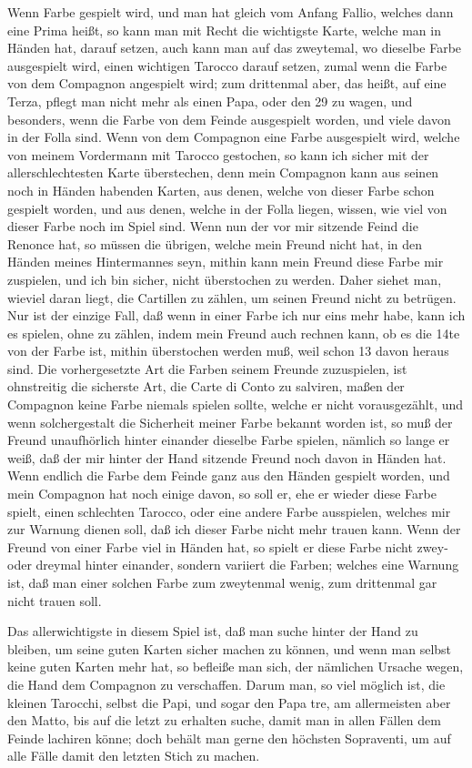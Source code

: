 \documentclass[11pt,a6paper,twoside]{article}
\begin{document}
Wenn Farbe gespielt wird, und man hat gleich vom Anfang Fallio, welches dann eine Prima heißt, so kann man mit Recht die wichtigste Karte, welche man in Händen hat, darauf setzen, auch kann man auf das zweytemal, wo dieselbe Farbe ausgespielt wird, einen wichtigen Tarocco darauf setzen, zumal wenn die Farbe von dem Compagnon angespielt wird; zum drittenmal aber, das heißt, auf eine Terza, pflegt man nicht mehr als einen Papa, oder den 29 zu wagen, und besonders, wenn die Farbe von dem Feinde ausgespielt worden, und viele davon in der Folla sind. Wenn von dem Compagnon eine Farbe ausgespielt wird, welche von meinem Vordermann mit Tarocco gestochen, so kann ich sicher mit der allerschlechtesten Karte überstechen, denn mein Compagnon kann aus seinen noch in Händen habenden Karten, aus denen, welche von dieser Farbe schon gespielt worden, und aus denen, welche in der Folla liegen, wissen, wie viel von dieser Farbe noch im Spiel sind. Wenn nun der vor mir sitzende Feind die Renonce hat, so müssen die übrigen, welche mein Freund nicht hat, in den Händen meines Hintermannes seyn, mithin kann mein Freund diese Farbe mir zuspielen, und ich bin sicher, nicht überstochen zu werden. Daher siehet man, wieviel daran liegt, die Cartillen zu zählen, um seinen Freund nicht zu betrügen. Nur ist der einzige Fall, daß wenn in einer Farbe ich nur eins mehr habe, kann ich es spielen, ohne zu zählen, indem mein Freund auch rechnen kann, ob es die 14te von der Farbe ist, mithin überstochen werden muß, weil schon 13 davon heraus sind. Die vorhergesetzte Art die Farben seinem Freunde zuzuspielen, ist ohnstreitig die sicherste Art, die Carte di Conto zu salviren, maßen der Compagnon keine Farbe niemals spielen sollte, welche er nicht vorausgezählt, und wenn solchergestalt die Sicherheit meiner Farbe bekannt worden ist, so muß der Freund unaufhörlich hinter einander dieselbe Farbe spielen, nämlich so lange er weiß, daß der mir hinter der Hand sitzende Freund noch davon in Händen hat. Wenn endlich die Farbe dem Feinde ganz aus den Händen gespielt worden, und mein Compagnon hat noch einige davon, so soll er, ehe er wieder diese Farbe spielt, einen schlechten Tarocco, oder eine andere Farbe ausspielen, welches mir zur Warnung dienen soll, daß ich dieser Farbe nicht mehr trauen kann. Wenn der Freund von einer Farbe viel in Händen hat, so spielt er diese Farbe nicht zwey- oder dreymal hinter einander, sondern variiert die Farben; welches eine Warnung ist, daß man einer solchen Farbe zum zweytenmal wenig, zum drittenmal gar nicht trauen soll.

Das allerwichtigste in diesem Spiel ist, daß man suche hinter der Hand zu bleiben, um seine guten Karten sicher machen zu können, und wenn man selbst keine guten Karten mehr hat, so befleiße man sich, der nämlichen Ursache wegen, die Hand dem Compagnon zu verschaffen. Darum man, so viel möglich ist, die kleinen Tarocchi, selbst die Papi, und sogar den Papa tre, am allermeisten aber den Matto, bis auf die letzt zu erhalten suche, damit man in allen Fällen dem Feinde lachiren könne; doch behält man gerne den höchsten Sopraventi, um auf alle Fälle damit den letzten Stich zu machen.
\end{document}
